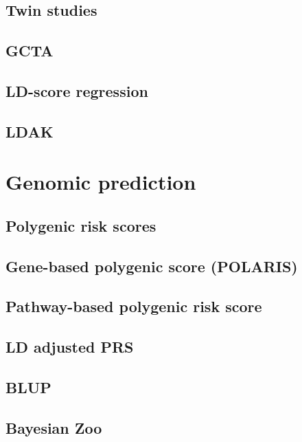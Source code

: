 \documentclass[]{book}
\theoremstyle{definition}
\theoremstyle{definition}
\theoremstyle{definition}
\theoremstyle{remark}
\begin{document}
\section{Twin studies}\label{twin-studies}

\section{GCTA}\label{gcta}

\section{LD-score regression}\label{ld-score-regression}

\section{LDAK}\label{ldak}

\chapter{Genomic prediction}\label{genomic-prediction}

\section{Polygenic risk scores}\label{polygenic-risk-scores}

\section{Gene-based polygenic score
(POLARIS)}\label{gene-based-polygenic-score-polaris}

\section{Pathway-based polygenic risk
score}\label{pathway-based-polygenic-risk-score}

\section{LD adjusted PRS}\label{ld-adjusted-prs}

\section{BLUP}\label{blup}

\section{Bayesian Zoo}\label{bayesian-zoo}
\end{document}
